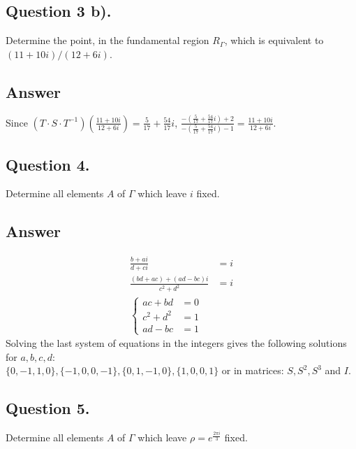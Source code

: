 \subsection{Question 3 b).}
\noindent
Determine the point, in the fundamental region $R_\Gamma$, which is equivalent to $(11 + 10i)/(12 + 6i)$.

\subsection*{Answer}
\noindent
Since $(T \cdot S \cdot T^{-1})(\frac{11+10i}{12+6i})=\frac{5}{17}+\frac{54}{17}i$,
$\frac{-(\frac{5}{17}+\frac{54}{17}i)+2}{-(\frac{5}{17}+\frac{54}{17}i)-1} = \frac{11+10i}{12+6i}$.



\subsection{Question 4.}
\noindent
Determine all elements $A$ of $\Gamma$ which leave $i$ fixed.

\subsection*{Answer}
\noindent
\begin{align*}
    \frac{b + a i}{d + c i} &= i \\
    \frac{(b d + a c) + (a d - b c) i}{c^2 + d^2} &= i \\
    \left\{
    \begin{array}{ll}
        ac + bd &= 0\\
        c^2 + d^2 &= 1\\
        ad - bc &= 1
    \end{array}
    \right.
\end{align*}
Solving the last system of equations in the integers gives the following solutions for ${a,b,c,d}$: \\
$\{0,-1,1,0\},\{-1,0,0,-1\},\{0,1,-1,0\},\{1,0,0,1\}$ or in matrices: $S, S^2, S^3$ and $I$.


\subsection{Question 5.}
\noindent
Determine all elements $A$ of $\Gamma$ which leave $\rho = e^{\frac{2 \pi i}{3}} $ fixed.

